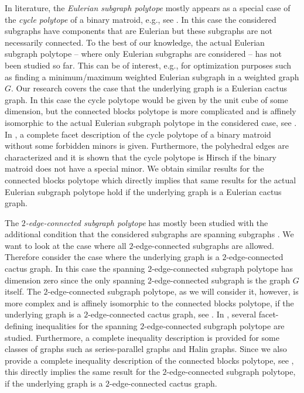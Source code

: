 \documentclass[12pt]{amsart}
\newcommand{\Xr}[1]{}
\newcommand{\Xn}[1]{{\protect#1}}
\begin{document}
In literature, the \Xr{Eulerian subgraph polytope}\Xn{\emph{Eulerian subgraph polytope}} mostly appears as a special case of the \textit{cycle polytope} of a binary matroid, e.g., see \cite{cyclepolytope}. In this case the considered subgraphs have components that are Eulerian but these subgraphs are not necessarily connected. To the best of our knowledge, the actual Eulerian subgraph polytope -- where only Eulerian subgraphs are considered -- has not been studied so far. This can be of interest, e.g., for optimization purposes such as finding a minimum/maximum weighted Eulerian subgraph in a weighted graph $G$. Our research covers the case that the underlying graph is a Eulerian cactus graph. In this case the cycle polytope would be given by the unit cube of some dimension, but the connected blocks polytope is more complicated \Xn{and is affinely isomorphic to the actual Eulerian subgraph polytope} in the considered case\Xn{, see }. In \cite{cyclepolytope}, a complete facet description of the cycle polytope of a binary matroid without some forbidden minors is given. Furthermore, the polyhedral edges are characterized and it is shown that the cycle polytope is Hirsch if the binary matroid does not have a special minor. \Xn{We obtain similar results for the connected blocks polytope which directly implies that same results for the actual Eulerian subgraph polytope hold if the underlying graph is a Eulerian cactus graph.}

The \Xr{$2$-edge-connected subgraph polytope}\Xn{\emph{$2$-edge-connected subgraph polytope}} has mostly been studied with the additional condition that the considered subgraphs are spanning subgraphs \cite{2connected1,2connected}. We want to look at the case where all $2$-edge-connected subgraphs are allowed. Therefore consider the case where the underlying graph is a $2$-edge-connected cactus graph. In this case the spanning $2$-edge-connected subgraph polytope has dimension zero since the only spanning $2$-edge-connected subgraph is the graph $G$ itself. The $2$-edge-connected subgraph polytope, as we will consider it, however, is more complex \Xn{and is affinely isomorphic to the connected blocks polytope, if the underlying graph is a $2$-edge-connected cactus graph, see \Cref{proposition connection}}. In \cite{2connected1,2connected}, several facet-defining inequalities for the spanning $2$-edge-connected subgraph polytope are studied. Furthermore, a complete inequality description is provided for some classes of graphs such as series-parallel graphs and Halin graphs. \Xn{Since we also provide a complete inequality description of the connected blocks polytope, see \Cref{completefacets}, this directly implies the same result for the $2$-edge-connected subgraph polytope, if the underlying graph is a $2$-edge-connected cactus graph.}
\end{document}
